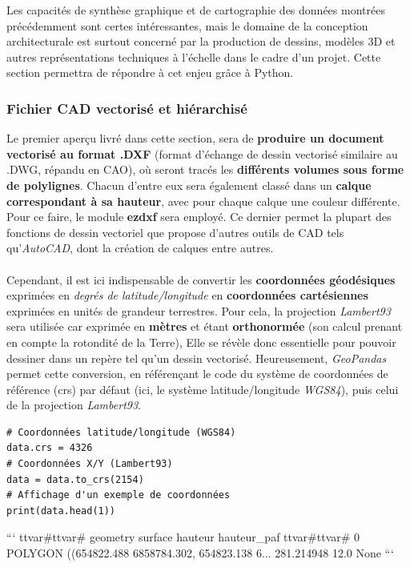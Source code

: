 \documentclass[
  11pt,
  french,
]{article}
\begin{document}
Les capacités de synthèse graphique et de cartographie des données
montrées précédemment sont certes intéressantes, mais le domaine de la
conception architecturale est surtout concerné par la production de
dessins, modèles 3D et autres représentations techniques à l'échelle
dans le cadre d'un projet. Cette section permettra de répondre à cet
enjeu grâce à Python.

\hypertarget{fichier-cad-vectorisuxe9-et-hiuxe9rarchisuxe9}{%
\subsubsection{Fichier CAD vectorisé et
hiérarchisé}\label{fichier-cad-vectorisuxe9-et-hiuxe9rarchisuxe9}}

Le premier aperçu livré dans cette section, sera de \textbf{produire un
document vectorisé au format .DXF} (format d'échange de dessin vectorisé
similaire au .DWG, répandu en CAO), où seront tracés les
\textbf{différents volumes sous forme de polylignes}. Chacun d'entre eux
sera également classé dans un \textbf{calque correspondant à sa
hauteur}, avec pour chaque calque une couleur différente. Pour ce faire,
le module \textbf{ezdxf} sera employé. Ce dernier permet la plupart des
fonctions de dessin vectoriel que propose d'autres outils de CAD tels
qu'\emph{AutoCAD}, dont la création de calques entre autres.\\
~\\
Cependant, il est ici indispensable de convertir les \textbf{coordonnées
géodésiques} exprimées en \emph{degrés de latitude/longitude} en
\textbf{coordonnées cartésiennes} exprimées en unités de grandeur
terrestres. Pour cela, la projection \emph{Lambert93} sera utilisée car
exprimée en \textbf{mètres} et étant \textbf{orthonormée} (son calcul
prenant en compte la rotondité de la Terre), Elle se révèle donc
essentielle pour pouvoir dessiner dans un repère tel qu'un dessin
vectorisé. Heureusement, \emph{GeoPandas} permet cette conversion, en
référençant le code du système de coordonnées de référence (crs) par
défaut (ici, le système latitude/longitude \emph{WGS84}), puis celui de
la projection \emph{Lambert93}.

\begin{tcolorbox}[title= Carte des volumes par hauteur avec de l'interactivité ,colback=boitecode]
\begin{lstlisting}[style=code]
# Coordonnées latitude/longitude (WGS84)
data.crs = 4326
# Coordonnées X/Y (Lambert93)
data = data.to_crs(2154)
# Affichage d'un exemple de coordonnées
print(data.head(1))\end{lstlisting}

```
ttvar{#}ttvar{#}                                             geometry     surface  hauteur hauteur_paf
ttvar{#}ttvar{#} 0  POLYGON ((654822.488 6858784.302, 654823.138 6...  281.214948     12.0        None
```

\end{tcolorbox}
\end{document}
